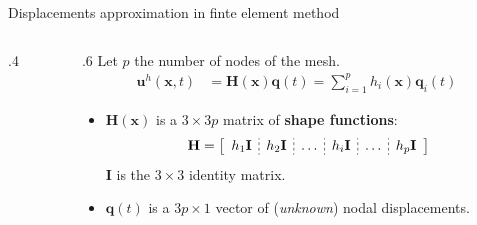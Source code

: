 \documentclass[aspectratio=169]{beamer}
\begin{document}
{\begin{frame}{Displacements approximation in finte element method}
\begin{columns}[T]
\begin{column}{.4\textwidth}
    \end{column}
    \begin{column}{.6\textwidth}
      Let $p$ the number of nodes of the mesh.
      \vspace{-.2cm}
      \begin{align*}
        \mathbf u^{h}(\mathbf x,t) & =\mathbf H(\mathbf x)\mathbf q(t) = \sum_{i=1}^{p}h_{i}(\mathbf x)\mathbf q_{i}(t)
      \end{align*}
      \vspace{-.5cm}
      \begin{itemize}
        \item $\mathbf H(\mathbf x)$ is a $3\times 3p$ matrix of \textbf{shape functions}:
              $$
                \mathbf H
                =\left[
                  \begin{array}{c;{2pt/2pt}c;{2pt/2pt}c;{2pt/2pt}c;{2pt/2pt}c;{2pt/2pt}c}
                    h_{1}\mathbf I & h_{2}\mathbf I & \dots & h_{i}\mathbf I & \dots & h_{p}\mathbf I \\
                  \end{array} \right]
              $$
              $\mathbf I$ is the $3\times 3$ identity matrix.
        \item $\mathbf q(t)$ is a $3p\times 1$ vector of (\emph{unknown}) nodal displacements.

      \end{itemize}
    \end{column}
  \end{columns}
\end{frame}


}
\end{document}
